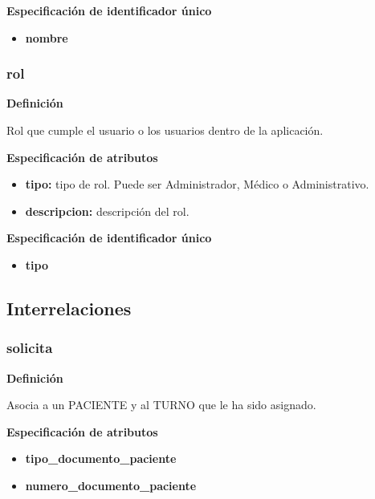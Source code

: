 \documentclass[a4paper,11pt]{article}
\begin{document}
\textbf{Especificación de identificador único}

\begin{itemize}

     \item \textbf{nombre}

\end{itemize}

\subsubsection{\textbf{rol}}

\textbf{Definición}

Rol que cumple el usuario o los usuarios dentro de la aplicación.

\textbf{Especificación de atributos}

\begin{itemize}

     \item \textbf{tipo:} tipo de rol. Puede ser Administrador, Médico o Administrativo. 
	 
     \item \textbf{descripcion:} descripción del rol. 

\end{itemize}

\textbf{Especificación de identificador único}

\begin{itemize}

     \item \textbf{tipo}

\end{itemize}



\subsection{\textbf{Interrelaciones}}

\subsubsection{\textbf{solicita}}

\textbf{Definición}

Asocia a un PACIENTE y al TURNO que le ha sido asignado.

\textbf{Especificación de atributos}

\begin{itemize}

     \item \textbf{tipo\_documento\_paciente}

     \item \textbf{numero\_documento\_paciente}


\end{itemize}
\end{document}
